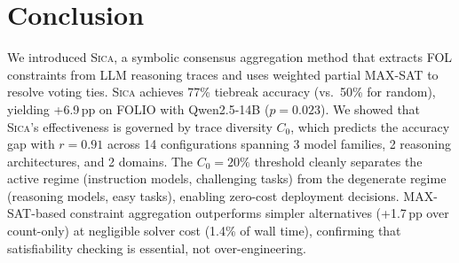 \documentclass[11pt,a4paper]{article}
\newcommand{\sica}{\textsc{Sica}}
\newcommand{\czero}{C_0}
\begin{document}
\section{Conclusion}
\label{sec:conclusion}

We introduced \sica{}, a symbolic consensus aggregation method that extracts FOL constraints from LLM reasoning traces and uses weighted partial MAX-SAT to resolve voting ties.
\sica{} achieves 77\% tiebreak accuracy (vs.\ 50\% for random), yielding +6.9\,pp on FOLIO with Qwen2.5-14B ($p{=}0.023$).
We showed that \sica{}'s effectiveness is governed by trace diversity $\czero{}$, which predicts the accuracy gap with $r{=}0.91$ across 14 configurations spanning 3 model families, 2 reasoning architectures, and 2 domains.
The $\czero{}{=}20\%$ threshold cleanly separates the active regime (instruction models, challenging tasks) from the degenerate regime (reasoning models, easy tasks), enabling zero-cost deployment decisions.
MAX-SAT-based constraint aggregation outperforms simpler alternatives (+1.7\,pp over count-only) at negligible solver cost (1.4\% of wall time), confirming that satisfiability checking is essential, not over-engineering.



\end{document}
